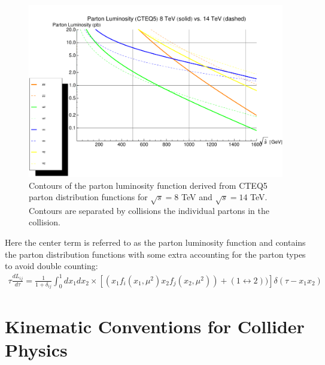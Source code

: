 \begin{figure}
\begin{center}
\includegraphics[width=.95\textwidth]{pics/parton_lumi_8TeV_14TeV}
\end{center}
\caption{Contours of the parton luminosity function derived from CTEQ5 parton distribution functions for $\sqrt{s}=8$ TeV and
$\sqrt{s}=14$ TeV. Contours are separated by collisions the individual partons in the collision.  }
\label{fig:deltaRcones}
\end{figure}

Here the center term is referred to as the parton luminosity function and contains the parton distribution functions with
some extra accounting for the parton types to avoid double counting:
\begin{align*}
\tau\frac{dL_{ij}}{d\tau} = \frac{1}{1+\delta_{ij}} \int_0^1 dx_1 dx_2 \times \left [ (x_1 f_i(x_1,\mu^2) x_2 f_j(x_2,\mu^2)) + (1 \leftrightarrow 2)) \right ] \delta(\tau - x_1x_2) 
\end{align*}

\section{Kinematic Conventions for Collider Physics} 

